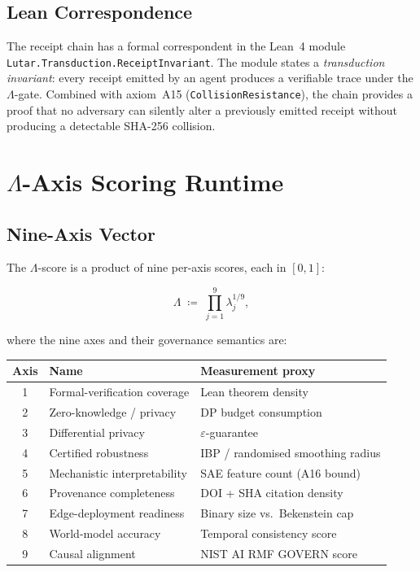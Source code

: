 \subsection{Lean Correspondence}
\label{ssec:receipt-lean}

The receipt chain has a formal correspondent in the Lean~4 module
\texttt{Lutar.Transduction.ReceiptInvariant}.  The module states a
\emph{transduction invariant}: every receipt emitted by an agent produces
a verifiable trace under the \(\Lambda\)-gate.  Combined with axiom~A15
(\texttt{CollisionResistance}), the chain provides a proof that no adversary
can silently alter a previously emitted receipt without producing a
detectable SHA-256 collision.

\section{\(\Lambda\)-Axis Scoring Runtime}
\label{sec:lambda-runtime}

\subsection{Nine-Axis Vector}
\label{ssec:nine-axis}

The \(\Lambda\)-score is a product of nine per-axis scores, each in
\([0,1]\):

\[
  \Lambda \;\coloneqq\; \prod_{j=1}^{9} \lambda_j^{1/9},
\]

where the nine axes and their governance semantics are:

\begin{center}
\begin{tabular}{cll}
  \textbf{Axis} & \textbf{Name} & \textbf{Measurement proxy} \\
  \hline
  1 & Formal-verification coverage & Lean theorem density \\
  2 & Zero-knowledge / privacy & DP budget consumption \\
  3 & Differential privacy & \(\varepsilon\)-guarantee \\
  4 & Certified robustness & IBP / randomised smoothing radius \\
  5 & Mechanistic interpretability & SAE feature count (A16 bound) \\
  6 & Provenance completeness & DOI + SHA citation density \\
  7 & Edge-deployment readiness & Binary size vs.\ Bekenstein cap \\
  8 & World-model accuracy & Temporal consistency score \\
  9 & Causal alignment & NIST AI RMF GOVERN score \\
\end{tabular}
\end{center}

